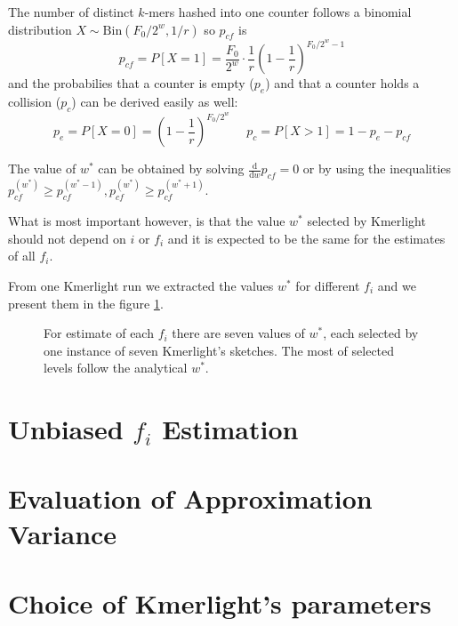 The number of distinct $k$-mers hashed into one counter follows a binomial distribution $X \sim \mathrm{Bin}(F_0/2^w, 1/r)$ so $p_{cf}$ is
$$p_{cf} = P[X=1] = \frac{F_0}{2^w} \cdot \frac{1}{r} \left(1 - \frac{1}{r}\right)^{F_0/2^w - 1}$$
and the probabilies that a counter is empty ($p_e$) and that a counter holds a collision ($p_c$) can be derived easily as well:
$$p_e = P[X=0] = \left(1 - \frac{1}{r}\right)^{F_0/2^w} ~~~~~~ p_c = P[X>1] = 1 - p_e - p_{cf}$$

The value of $w^*$ can be obtained by solving $\frac{\mathrm{d}}{\mathrm{d}w}p_{cf} = 0$ or by using the inequalities 
$p_{cf}^{(w^*)} \geq p_{cf}^{(w^*-1)}, p_{cf}^{(w^*)} \geq p_{cf}^{(w^*+1)}$. 

\medskip

What is most important however, is that the value $w^*$ selected by Kmerlight should not depend on $i$ or $f_i$ 
and it is expected to be the same for the estimates of all $f_i$.

From one Kmerlight run we extracted the values $w^*$ for different $f_i$ and we present them in the figure \ref{img:w-selected-by-kmerlight}.

\begin{figure}[h]
\caption[$w^*$ selected by Kmerlight]{For estimate of each $f_i$ there are seven values of $w^*$, 
each selected by one instance of seven Kmerlight's sketches. The most of selected levels follow the analytical $w^*$. }
\label{img:w-selected-by-kmerlight}
\end{figure}



\section{Unbiased $f_i$ Estimation}
\label{sec:unbiased-estimate}

\section{Evaluation of Approximation Variance}
\label{sec:estimation-variance}

\section{Choice of Kmerlight's parameters}
\label{sec:parameters-choice}
